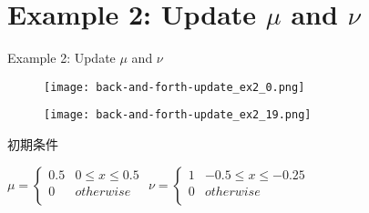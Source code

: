 \documentclass[aspectratio=169, dvipdfmx, 12pt]{beamer}
\begin{document}
\section{Example 2: Update $\mu$ and $\nu$}
\begin{frame}{Example 2: Update $\mu$ and $\nu$}
    \begin{figure}[htb]
        \begin{center}
            \begin{minipage}{0.45\hsize}
                \texttt{[image: back-and-forth-update\_ex2\_0.png]}
            \end{minipage}
            \begin{minipage}{0.45\hsize}
                \texttt{[image: back-and-forth-update\_ex2\_19.png]}
            \end{minipage}
        \end{center}
    \end{figure}
    \label{Example 2}

    初期条件
    \begin{center}
    $\mu = \left\{
        \begin{array}{ll}
            0.5 & 0 \le x \le 0.5 \\
            0 & otherwise \\
        \end{array}
    \right.
    $
    $\nu = \left\{
        \begin{array}{ll}
            1 & - 0.5 \le x \le - 0.25 \\
            0 & otherwise \\
        \end{array}
    \right.
    $
    \end{center}

\end{frame}
\end{document}
